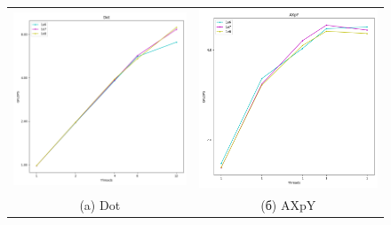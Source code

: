 \documentclass[12pt, a4paper]{article}
\begin{document}
\begin{figure}[H]
	\center
	\begin{tabular}{cc}
		\includegraphics[width=85mm]{2025/openmp_dot} & \includegraphics[width=85mm]{2025/openmp_axpy} \\
		(a) Dot & (б) AXpY \\

\end{tabular}
\end{figure}
\end{document}
